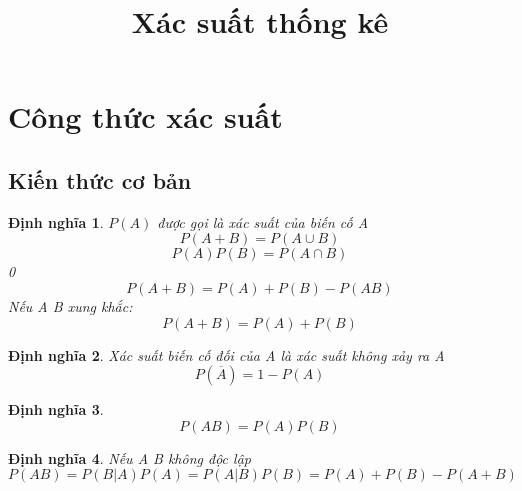 \documentclass[12pt]{article}
\def\bar#1{\overline{#1}}
\newtheorem{thm}{Định nghĩa}
\begin{document}
\title{Xác suất thống kê}
\date{}
\maketitle

\section{Công thức xác suất}
\subsection{Kiến thức cơ bản}
\begin{thm}
$P(A)$ được gọi là xác suất của biến cố A
\begin{equation}
    P(A + B) = P( A \cup B) 
\end{equation}
\begin{equation}
    P(A)P(B) = P(A \cap B) 
 \end{equation}0
\begin{equation}
    P(A + B) = P(A) + P(B) - P(AB)
    \end{equation}
Nếu A B xung khắc:
\begin{equation}
P(A + B) = P(A) + P(B) 
\end{equation}
\end{thm}

\begin{thm}
Xác suất biến cố đối của A là xác suất không xảy ra A
\begin{equation}
P(\bar{A}) = 1 - P(A)
\end{equation}
\end{thm}
\begin{thm}
\begin{equation}
    P(AB) = P(A)P(B)
\end{equation}
\end{thm}

\begin{thm}
Nếu A B không độc lập
\begin{equation}
    P(AB) = P(B|A)P(A) = P(A|B)P(B) = P(A) + P(B) - P(A + B)
\end{equation}
\end{thm}
\end{document}
